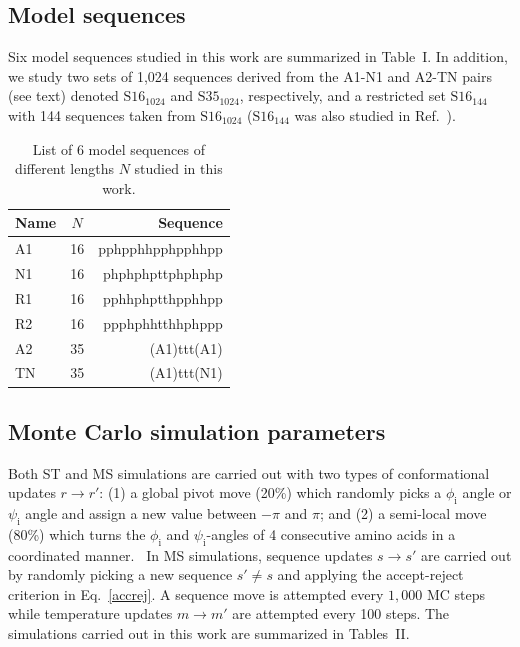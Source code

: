 \documentclass[%
 aip,
rsi,%
 amsmath,amssymb,
 reprint,%
]{revtex4-1}
\newcommand	 {\sbar}	{{s}}
\newcommand	 {\rbar}	{{r}}
\begin{document}
\subsection{Model sequences}

Six model sequences studied in this work are summarized in Table~I. In addition, we study two sets of 1,024 sequences derived from the A1-N1 and A2-TN pairs (see text) denoted $\mathrm{S16}_{1024}$  and $\mathrm{S35}_{1024}$, respectively, and a restricted set $\mathrm{S16}_{144}$ with 144 sequences taken from $\mathrm{S16}_{1024}$ ($\mathrm{S16}_{144}$ was also studied in Ref.~\protect{}).
 
\begin{table}
\caption{\label{tab1} List of 6 model sequences of different lengths $N$ studied in this work.}
\begin{ruledtabular}
\begin{tabular}{lcr}
Name & $N$ & Sequence \\
\hline
A1 & 16 & pphpphhpphpphhpp \\
N1 & 16 & phphphpttphphphp \\
R1 & 16 & pphhphptthpphhpp\\
R2 & 16 & ppphphhtthhphppp\\
A2 & 35 & (A1)ttt(A1)\\
TN & 35 & (A1)ttt(N1)\\
\end{tabular}
\end{ruledtabular}
\end{table}


\subsection{Monte Carlo simulation parameters}
\noindent
Both ST and MS simulations are carried out with two types of conformational updates $\rbar\rightarrow\rbar'$: (1) a global pivot move (20\%) which randomly picks a $\phi_\mathrm{i}$ angle or $\psi_\mathrm{i}$ angle and assign a new value between $-\pi$ and $\pi$; and (2) a semi-local move (80\%) which turns the $\phi_\mathrm{i}$ and $\psi_\mathrm{i}$-angles of 4 consecutive amino acids in a coordinated manner.~\cite{Favrin2001} In MS simulations, sequence updates $\sbar\rightarrow\sbar'$ are carried out by randomly picking a new sequence $\sbar'\ne\sbar$ and applying the accept-reject criterion in Eq.~\ref{accrej}. A sequence move is attempted every $1,000$ MC steps while temperature updates $m\rightarrow m'$ are attempted every 100 steps. The simulations carried out in this work are summarized in Tables~II.
\end{document}
